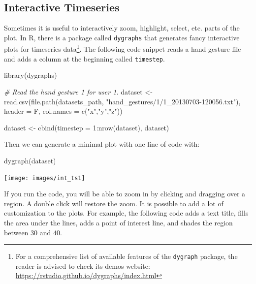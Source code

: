 \documentclass[
  11pt,
]{krantz}
\newenvironment{Shaded}{\begin{snugshade}}{\end{snugshade}}
\newcommand{\AttributeTok}[1]{\textcolor[rgb]{0.61,0.61,0.61}{#1}}
\newcommand{\CommentTok}[1]{\textcolor[rgb]{0.37,0.37,0.37}{\textit{#1}}}
\newcommand{\DecValTok}[1]{\textcolor[rgb]{0.06,0.06,0.06}{#1}}
\newcommand{\FunctionTok}[1]{\textcolor[rgb]{0,0,0}{#1}}
\newcommand{\NormalTok}[1]{#1}
\newcommand{\OtherTok}[1]{\textcolor[rgb]{0.37,0.37,0.37}{#1}}
\newcommand{\SpecialCharTok}[1]{\textcolor[rgb]{0,0,0}{#1}}
\newcommand{\StringTok}[1]{\textcolor[rgb]{0.5,0.5,0.5}{#1}}
\begin{document}
\hypertarget{interactive-timeseries}{%
\subsection{Interactive Timeseries}\label{interactive-timeseries}}

Sometimes it is useful to interactively zoom, highlight, select, etc. parts of the plot. In R, there is a package called \texttt{dygraphs} \citep{dygraphs} that generates fancy interactive plots for timeseries data\footnote{For a comprehensive list of available features of the \texttt{dygraph} package, the reader is advised to check its demos website: \url{https://rstudio.github.io/dygraphs/index.html}}. The following code snippet reads a hand gesture file and adds a column at the beginning called \texttt{timestep}.

\begin{Shaded}
\begin{Highlighting}[]
\FunctionTok{library}\NormalTok{(dygraphs)}

\CommentTok{\# Read the hand gesture \textquotesingle{}1\textquotesingle{} for user 1.}
\NormalTok{dataset }\OtherTok{\textless{}{-}} \FunctionTok{read.csv}\NormalTok{(}\FunctionTok{file.path}\NormalTok{(datasets\_path,}
                              \StringTok{"hand\_gestures/1/1\_20130703{-}120056.txt"}\NormalTok{),}
                    \AttributeTok{header =}\NormalTok{ F,}
                    \AttributeTok{col.names =} \FunctionTok{c}\NormalTok{(}\StringTok{"x"}\NormalTok{,}\StringTok{"y"}\NormalTok{,}\StringTok{"z"}\NormalTok{))}

\NormalTok{dataset }\OtherTok{\textless{}{-}} \FunctionTok{cbind}\NormalTok{(}\AttributeTok{timestep =} \DecValTok{1}\SpecialCharTok{:}\FunctionTok{nrow}\NormalTok{(dataset), dataset)}
\end{Highlighting}
\end{Shaded}

Then we can generate a minimal plot with one line of code with:

\begin{Shaded}
\begin{Highlighting}[]
\FunctionTok{dygraph}\NormalTok{(dataset)}
\end{Highlighting}
\end{Shaded}

\begin{center}\texttt{[image: images/int\_ts1]} \end{center}

If you run the code, you will be able to zoom in by clicking and dragging over a region. A double click will restore the zoom. It is possible to add a lot of customization to the plots. For example, the following code adds a text title, fills the area under the lines, adds a point of interest line, and shades the region between \(30\) and \(40\).
\end{document}
